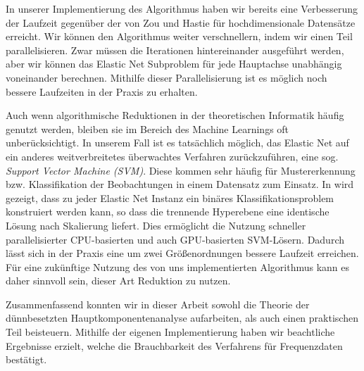 In unserer Implementierung des Algorithmus haben wir bereits eine Verbesserung der Laufzeit gegenüber der von Zou und Hastie für hochdimensionale Datensätze erreicht. Wir können den Algorithmus weiter verschnellern, indem wir einen Teil parallelisieren. Zwar müssen die Iterationen hintereinander ausgeführt werden, aber wir können das Elastic Net Subproblem für jede Hauptachse unabhängig voneinander berechnen. Mithilfe dieser Parallelisierung ist es möglich noch bessere Laufzeiten in der Praxis zu erhalten.

Auch wenn algorithmische Reduktionen in der theoretischen Informatik häufig genutzt werden, bleiben sie im Bereich des Machine Learnings oft unberücksichtigt. In unserem Fall ist es tatsächlich möglich, das Elastic Net auf ein anderes weitverbreitetes überwachtes Verfahren zurückzuführen, eine sog. \textit{Support Vector Machine (SVM)}. Diese kommen sehr häufig für Mustererkennung bzw. Klassifikation der Beobachtungen in einem Datensatz zum Einsatz. In \cite{zhou} wird gezeigt, dass zu jeder Elastic Net Instanz ein binäres Klassifikationsproblem konstruiert werden kann, so dass die trennende Hyperebene eine identische Lösung nach Skalierung liefert. Dies ermöglicht die Nutzung schneller parallelisierter CPU-basierten und auch GPU-basierten SVM-Lösern. Dadurch lässt sich in der Praxis eine um zwei Größenordnungen bessere Laufzeit erreichen. Für eine zukünftige Nutzung des von uns implementierten Algorithmus kann es daher sinnvoll sein, dieser Art Reduktion zu nutzen.

Zusammenfassend konnten wir in dieser Arbeit sowohl die Theorie der dünnbesetzten Hauptkomponentenanalyse aufarbeiten, als auch einen praktischen Teil beisteuern. Mithilfe der eigenen Implementierung haben wir beachtliche Ergebnisse erzielt, welche die Brauchbarkeit des Verfahrens für Frequenzdaten bestätigt. 
